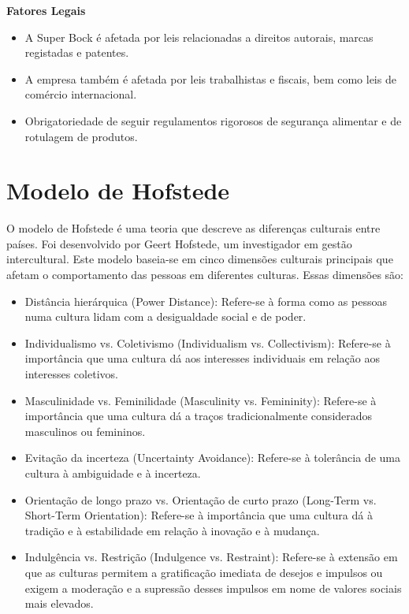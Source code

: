 \noindent \textbf{Fatores Legais} %
\begin{itemize}
    \item A Super Bock é afetada por leis relacionadas a direitos autorais, marcas registadas e patentes.
    \item A empresa também é afetada por leis trabalhistas e fiscais, bem como leis de comércio internacional.
    \item Obrigatoriedade de seguir regulamentos rigorosos de segurança alimentar e de rotulagem de produtos.
\end{itemize}

\section{Modelo de Hofstede}
O modelo de Hofstede é uma teoria que descreve as diferenças culturais entre países. Foi desenvolvido por Geert Hofstede, um investigador em gestão intercultural. Este modelo baseia-se em cinco dimensões culturais principais que afetam o comportamento das pessoas em diferentes culturas. Essas dimensões são:

\noindent \textbf{}
\begin{itemize}
    
\item Distância hierárquica (Power Distance): Refere-se à forma como as pessoas numa cultura lidam com a desigualdade social e de poder.
\item Individualismo vs. Coletivismo (Individualism vs. Collectivism): Refere-se à importância que uma cultura dá aos interesses individuais em relação aos interesses coletivos.

\item Masculinidade vs. Feminilidade (Masculinity vs. Femininity): Refere-se à importância que uma cultura dá a traços tradicionalmente considerados masculinos ou femininos.


\item Evitação da incerteza (Uncertainty Avoidance): Refere-se à tolerância de uma cultura à ambiguidade e à incerteza.


\item Orientação de longo prazo vs. Orientação de curto prazo (Long-Term vs. Short-Term Orientation): Refere-se à importância que uma cultura dá à tradição e à estabilidade em relação à inovação e à mudança.

\item Indulgência vs. Restrição (Indulgence vs. Restraint): Refere-se à extensão em que as culturas permitem a gratificação imediata de desejos e impulsos ou exigem a moderação e a supressão desses impulsos em nome de valores sociais mais elevados.

\end{itemize}

